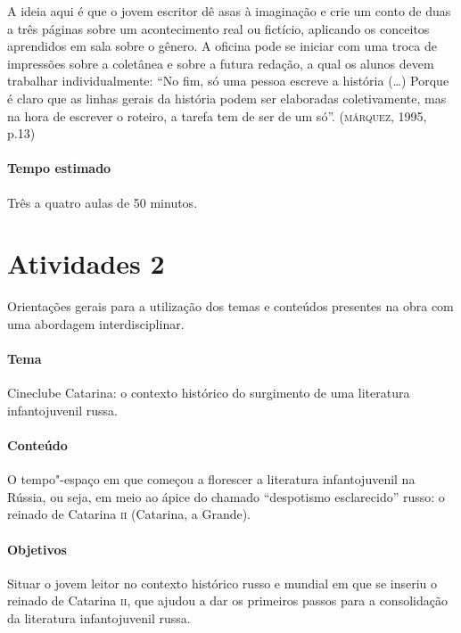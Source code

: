 \documentclass[11pt]{extarticle}
\begin{document}
A ideia aqui é que o jovem escritor dê asas à imaginação e crie um conto
de duas a três páginas sobre um acontecimento real ou fictício,
aplicando os conceitos aprendidos em sala sobre o gênero. A oficina pode
se iniciar com uma troca de impressões sobre a coletânea e sobre a
futura redação, a qual os alunos devem trabalhar individualmente: ``No
fim, só uma pessoa escreve a história (\ldots{}) Porque é claro que as linhas
gerais da história podem ser elaboradas coletivamente, mas na hora de
escrever o roteiro, a tarefa tem de ser de um só''. (\textsc{márquez}, 1995,
p.13)

\paragraph{Tempo estimado} Três a quatro aulas de 50 minutos.

\section{Atividades 2}

Orientações gerais para a utilização dos temas e conteúdos
presentes na obra com uma abordagem interdisciplinar.

\paragraph{Tema} Cineclube Catarina: o contexto histórico do
surgimento de uma literatura infantojuvenil russa.


\paragraph{Conteúdo}
O tempo"-espaço em que começou a florescer a literatura infantojuvenil na
Rússia, ou seja, em meio ao ápice do chamado ``despotismo esclarecido''
russo: o reinado de Catarina \textsc{ii} (Catarina, a Grande).

\paragraph{Objetivos}
Situar o jovem leitor no contexto histórico russo e mundial em que se
inseriu o reinado de Catarina \textsc{ii}, que ajudou a dar os primeiros passos
para a consolidação da literatura infantojuvenil russa.
\end{document}
